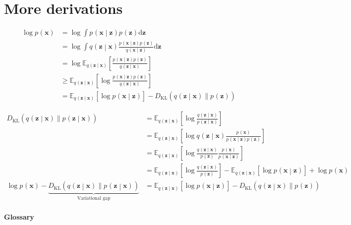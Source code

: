 \documentclass{article}
\newcommand{\prob}[3]{{#1}_{#2} \left( #3 \right)}
\newcommand{\condprob}[4]{{#1}_{#2} \left( #3 \middle| #4 \right)}
\newcommand{\expected}[2]{\mathbb{E}_{#1}\left[ #2 \right]}
\newcommand{\KL}[2]{D_{\mathrm{KL}}\left( #1 \| #2 \right)}
\newcommand{\x}{\mathbf{x}}
\newcommand{\z}{\mathbf{z}}
\begin{document}

\appendix
\section{More derivations}
\begin{align*}
\log \prob{p}{}{\x} 
&=  \log \int \condprob{p}{}{\x}{\z} \prob{p}{}{\z} \mathrm{d}\z \\
&= \log \int \condprob{q}{}{\z}{\x} \frac{\condprob{p}{}{\x}{\z} \prob{p}{}{\z}}{\condprob{q}{}{\x}{\z}} \mathrm{d}\z \\
&= \log \expected{\condprob{q}{}{\z}{\x}}{
\frac{\condprob{p}{}{\x}{\z} \prob{p}{}{\z}}{\condprob{q}{}{\z}{\x}}} \\
&\geq \expected{\condprob{q}{}{\z}{\x}}{\log 
\frac{\condprob{p}{}{\x}{\z} \prob{p}{}{\z}}{\condprob{q}{}{\z}{\x}}} \\
&= \expected{\condprob{q}{}{\z}{\x}}{\log \condprob{p}{}{\x}{\z}} - \KL{\condprob{q}{}{\z}{\x}}{\prob{p}{}{\z}}
\end{align*}

\begin{align*}
\KL{\condprob{q}{}{\z}{\x}}{\condprob{p}{}{\z}{\x}}
&= \expected{\condprob{q}{}{\z}{\x}}{\log 
\frac{\condprob{q}{}{\z}{\x} }{\condprob{p}{}{\z}{\x}}} \\
&= \expected{\condprob{q}{}{\z}{\x}}{
 	\log \condprob{q}{}{\z}{\x} 
 	\frac{\prob{p}{}{\x}}{\condprob{p}{}{\x}{\z} \prob{p}{}{\z}}} \\
&= \expected{\condprob{q}{}{\z}{\x}}{
 	\log \frac{\condprob{q}{}{\z}{\x}}{\prob{p}{}{\z}} 
 	\frac{\prob{p}{}{\x}}{\condprob{p}{}{\x}{\z}}} \\
&=\expected{\condprob{q}{}{\z}{\x}}{
 	\log \frac{\condprob{q}{}{\z}{\x}}{\prob{p}{}{\z}}} -
   \expected{\condprob{q}{}{\z}{\x}}{\log \condprob{p}{}{\x}{\z}} + \log \prob{p}{}{\x} \\
\log \prob{p}{}{\x} -
\underbrace{\KL{\condprob{q}{}{\z}{\x}}{\condprob{p}{}{\z}{\x}}}_{
	\text{Variational gap}
}
&= \expected{\condprob{q}{}{\z}{\x}}{\log \condprob{p}{}{\x}{\z}} - \KL{\condprob{q}{}{\z}{\x}}{\prob{p}{}{\z}}	
\end{align*}



\paragraph{Glossary}
\end{document}
